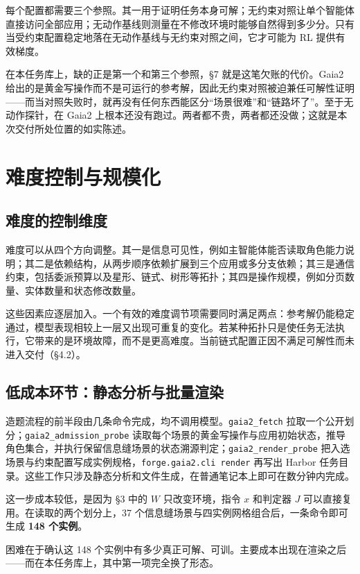 \documentclass[UTF8,11pt,fontset=fandol]{ctexart}
\begin{document}
每个配置都需要三个参照。其一用于证明任务本身可解；无约束对照让单个智能体直接访问全部应用；无动作基线则测量在不修改环境时能够自然得到多少分。只有当受约束配置稳定地落在无动作基线与无约束对照之间，它才可能为 RL 提供有效梯度。

在本任务库上，缺的正是第一个和第三个参照，\S7 就是这笔欠账的代价。Gaia2 给出的是黄金写操作而不是可运行的参考解，因此无约束对照被迫兼任可解性证明——而当对照失败时，就再没有任何东西能区分“场景很难”和“链路坏了”。至于无动作探针，在 Gaia2 上根本还没有跑过。两者都不贵，两者都还没做；这就是本次交付所处位置的如实陈述。

\section{难度控制与规模化}

\subsection{难度的控制维度}

难度可以从四个方向调整。其一是信息可见性，例如主智能体能否读取角色能力说明；其二是依赖结构，从两步顺序依赖扩展到三个应用或多分支依赖；其三是通信约束，包括委派预算以及星形、链式、树形等拓扑；其四是操作规模，例如分页数量、实体数量和状态修改数量。

这些因素应逐层加入。一个有效的难度调节项需要同时满足两点：参考解仍能稳定通过，模型表现相较上一层又出现可重复的变化。若某种拓扑只是使任务无法执行，它带来的是环境故障，而不是更高难度。当前链式配置正因不满足可解性而未进入交付（\S4.2）。

\subsection{低成本环节：静态分析与批量渲染}

造题流程的前半段由几条命令完成，均不调用模型。\texttt{gaia2\_fetch} 拉取一个公开划分；\texttt{gaia2\_admission\_probe} 读取每个场景的黄金写操作与应用初始状态，推导角色集合，并执行保留信息缝场景的状态溯源判定；\texttt{gaia2\_render\_probe} 把入选场景与约束配置写成实例规格，\texttt{forge.gaia2.cli render} 再写出 Harbor 任务目录。这些工作只涉及静态分析和文件生成，在普通笔记本上即可在数分钟内完成。

这一步成本较低，是因为 \S3 中的 $W$ 只改变环境，指令 $x$ 和判定器 $J$ 可以直接复用。在读取的两个划分上，37 个信息缝场景与四实例网格组合后，一条命令即可生成 \textbf{148 个实例}。

困难在于确认这 148 个实例中有多少真正可解、可训。主要成本出现在渲染之后——而在本任务库上，其中第一项完全换了形态。
\end{document}
